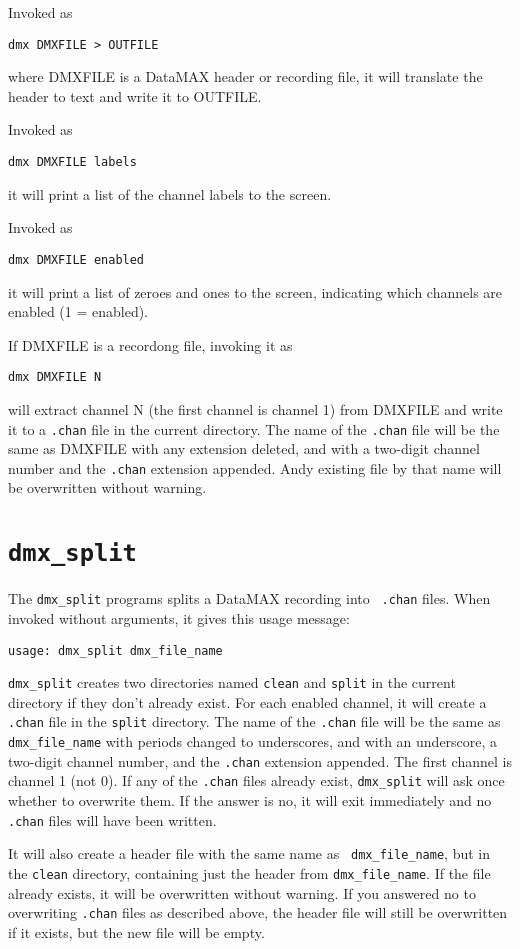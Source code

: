 \documentclass{article}
\begin{document}
Invoked as
\begin{verbatim}
dmx DMXFILE > OUTFILE
\end{verbatim}
where DMXFILE is a DataMAX header or recording file, it will translate
the header to text and write it to OUTFILE.

Invoked as
\begin{verbatim}
dmx DMXFILE labels
\end{verbatim}
it will print a list of the channel labels to the screen.

Invoked as
\begin{verbatim}
dmx DMXFILE enabled
\end{verbatim}
it will print a list of zeroes and ones to the screen, indicating
which channels are enabled (1 = enabled).

If DMXFILE is a recordong file, invoking it as
\begin{verbatim}
dmx DMXFILE N
\end{verbatim}
will extract channel N (the first channel is channel 1) from DMXFILE
and write it to a {\tt .chan} file in the current directory.  The name
of the {\tt .chan} file will be the same as DMXFILE with any extension
deleted, and with a two-digit channel number and the {\tt .chan}
extension appended.  Andy existing file by that name will be
overwritten without warning.

\section{\tt dmx\_split}
The {\tt dmx\_split} programs splits a DataMAX recording into {\tt
  .chan} files.  When invoked without arguments, it gives this usage
message:
\begin{verbatim}
usage: dmx_split dmx_file_name
\end{verbatim}
{\tt dmx\_split} creates two directories named {\tt clean} and {\tt split} in
the current directory if they don't already exist.  For each enabled
channel, it will create a {\tt .chan} file in the {\tt split}
directory.  The name of the {\tt .chan} file will be the same as
{\tt dmx\_file\_name} with periods changed to underscores, and with an underscore, a
two-digit channel number, and the {\tt .chan} extension appended.  The
first channel is channel 1 (not 0).  If any of the {\tt .chan} files
already exist, {\tt dmx\_split} will ask once whether to overwrite
them.  If the answer is no, it will exit immediately and no {\tt
  .chan} files will have been written.

It will also create a header file with the same name as {\tt
  dmx\_file\_name}, but in the {\tt clean} directory, containing just
the header from {\tt dmx\_file\_name}.  If the file already exists, it
will be overwritten without warning.  If you answered no to
overwriting {\tt .chan} files as described above, the header file will
still be overwritten if it exists, but the new file will be empty.
\end{document}
